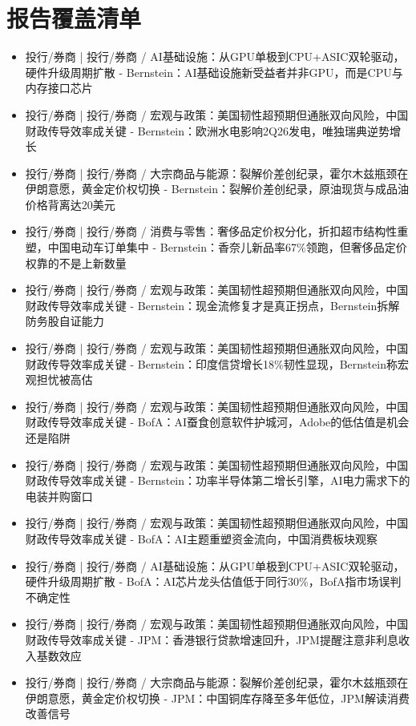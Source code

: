 \documentclass[11pt]{ctexart}
\begin{document}
\section{报告覆盖清单}
\begin{itemize}
  \item [R001] 投行/券商 | 投行/券商 / AI基础设施：从GPU单极到CPU+ASIC双轮驱动，硬件升级周期扩散 - Bernstein：AI基础设施新受益者并非GPU，而是CPU与内存接口芯片
  \item [R002] 投行/券商 | 投行/券商 / 宏观与政策：美国韧性超预期但通胀双向风险，中国财政传导效率成关键 - Bernstein：欧洲水电影响2Q26发电，唯独瑞典逆势增长
  \item [R003] 投行/券商 | 投行/券商 / 大宗商品与能源：裂解价差创纪录，霍尔木兹瓶颈在伊朗意愿，黄金定价权切换 - Bernstein：裂解价差创纪录，原油现货与成品油价格背离达20美元
  \item [R004] 投行/券商 | 投行/券商 / 消费与零售：奢侈品定价权分化，折扣超市结构性重塑，中国电动车订单集中 - Bernstein：香奈儿新品率67\%领跑，但奢侈品定价权靠的不是上新数量
  \item [R005] 投行/券商 | 投行/券商 / 宏观与政策：美国韧性超预期但通胀双向风险，中国财政传导效率成关键 - Bernstein：现金流修复才是真正拐点，Bernstein拆解防务股自证能力
  \item [R006] 投行/券商 | 投行/券商 / 宏观与政策：美国韧性超预期但通胀双向风险，中国财政传导效率成关键 - Bernstein：印度信贷增长18\%韧性显现，Bernstein称宏观担忧被高估
  \item [R007] 投行/券商 | 投行/券商 / 宏观与政策：美国韧性超预期但通胀双向风险，中国财政传导效率成关键 - BofA：AI蚕食创意软件护城河，Adobe的低估值是机会还是陷阱
  \item [R008] 投行/券商 | 投行/券商 / 宏观与政策：美国韧性超预期但通胀双向风险，中国财政传导效率成关键 - Bernstein：功率半导体第二增长引擎，AI电力需求下的电装并购窗口
  \item [R009] 投行/券商 | 投行/券商 / 宏观与政策：美国韧性超预期但通胀双向风险，中国财政传导效率成关键 - BofA：AI主题重塑资金流向，中国消费板块观察
  \item [R010] 投行/券商 | 投行/券商 / AI基础设施：从GPU单极到CPU+ASIC双轮驱动，硬件升级周期扩散 - BofA：AI芯片龙头估值低于同行30\%，BofA指市场误判不确定性
  \item [R011] 投行/券商 | 投行/券商 / 宏观与政策：美国韧性超预期但通胀双向风险，中国财政传导效率成关键 - JPM：香港银行贷款增速回升，JPM提醒注意非利息收入基数效应
  \item [R012] 投行/券商 | 投行/券商 / 大宗商品与能源：裂解价差创纪录，霍尔木兹瓶颈在伊朗意愿，黄金定价权切换 - JPM：中国铜库存降至多年低位，JPM解读消费改善信号

\end{itemize}
\end{document}
